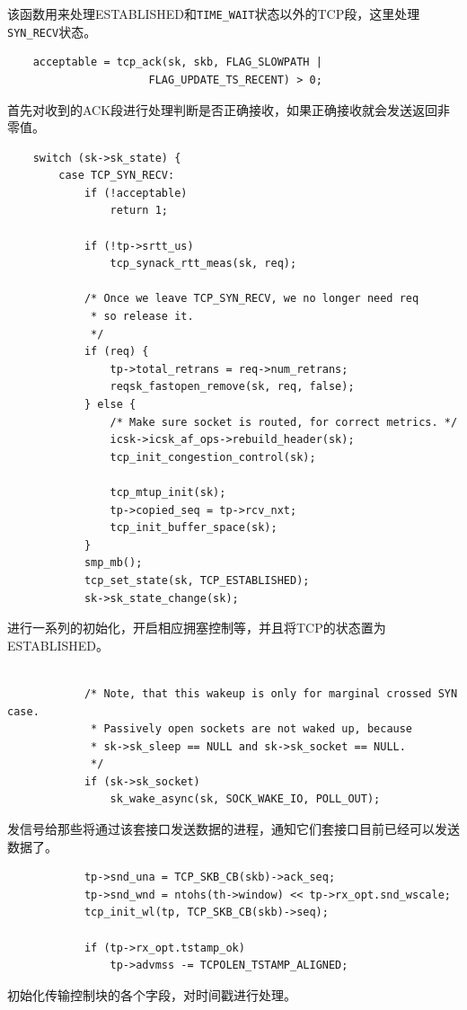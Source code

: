 					该函数用来处理ESTABLISHED和\texttt{TIME_WAIT}状态以外的TCP段，这里处理\texttt{SYN_RECV}状态。
\begin{verbatim}
	acceptable = tcp_ack(sk, skb, FLAG_SLOWPATH |
				      FLAG_UPDATE_TS_RECENT) > 0;
\end{verbatim}

					首先对收到的ACK段进行处理判断是否正确接收，如果正确接收就会发送返回非零值。

\begin{verbatim}
	switch (sk->sk_state) {
		case TCP_SYN_RECV:
			if (!acceptable)
				return 1;

			if (!tp->srtt_us)
				tcp_synack_rtt_meas(sk, req);

			/* Once we leave TCP_SYN_RECV, we no longer need req
			 * so release it.
			 */
			if (req) {
				tp->total_retrans = req->num_retrans;
				reqsk_fastopen_remove(sk, req, false);
			} else {
				/* Make sure socket is routed, for correct metrics. */
				icsk->icsk_af_ops->rebuild_header(sk);
				tcp_init_congestion_control(sk);

				tcp_mtup_init(sk);
				tp->copied_seq = tp->rcv_nxt;
				tcp_init_buffer_space(sk);
			}
			smp_mb();
			tcp_set_state(sk, TCP_ESTABLISHED);
			sk->sk_state_change(sk);
\end{verbatim}

					进行一系列的初始化，开启相应拥塞控制等，并且将TCP的状态置为ESTABLISHED。

\begin{verbatim}

			/* Note, that this wakeup is only for marginal crossed SYN case.
			 * Passively open sockets are not waked up, because
			 * sk->sk_sleep == NULL and sk->sk_socket == NULL.
			 */
			if (sk->sk_socket)
				sk_wake_async(sk, SOCK_WAKE_IO, POLL_OUT);
\end{verbatim}

					发信号给那些将通过该套接口发送数据的进程，通知它们套接口目前已经可以发送数据了。

\begin{verbatim}
			tp->snd_una = TCP_SKB_CB(skb)->ack_seq;
			tp->snd_wnd = ntohs(th->window) << tp->rx_opt.snd_wscale;
			tcp_init_wl(tp, TCP_SKB_CB(skb)->seq);

			if (tp->rx_opt.tstamp_ok)
				tp->advmss -= TCPOLEN_TSTAMP_ALIGNED;
\end{verbatim}

					初始化传输控制块的各个字段，对时间戳进行处理。

